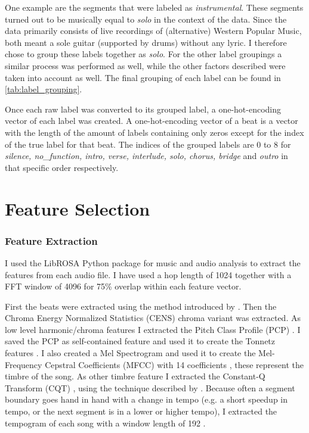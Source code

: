 One example are the segments that were labeled as \textit{instrumental}. These segments turned out to be musically equal to \textit{solo} in the context of the data. Since the data primarily consists of live recordings of (alternative) Western Popular Music, both meant a sole guitar (supported by drums) without any lyric. I therefore chose to group these labels together as \textit{solo}. For the other label groupings a similar process was performed as well, while the other factors described were taken into account as well. The final grouping of each label can be found in \autoref{tab:label_grouping}.

Once each raw label was converted to its grouped label, a one-hot-encoding vector of each label was created. A one-hot-encoding vector of a beat is a vector with the length of the amount of labels containing only zeros except for the index of the true label for that beat. The indices of the grouped labels are 0 to 8 for \textit{silence, no\_function, intro, verse, interlude, solo, chorus, bridge} and \textit{outro} in that specific order respectively.


\section{Feature Selection}
\subsubsection{Feature Extraction}

I used the LibROSA Python package for music and audio analysis \cite{Mcfee2015librosa} to extract the features from each audio file. I have used a hop length of 1024 together with a FFT window of 4096 for 75\% overlap within each feature vector.

First the beats were extracted using the method introduced by \textcite{Ellis2007beat}.
Then the Chroma Energy Normalized Statistics (CENS) \cite{Muller2005chroma} chroma variant was extracted. As low level harmonic/chroma features I extracted the Pitch Class Profile (PCP) \cite{Lee2006automatic}. I saved the PCP as self-contained feature and used it to create the Tonnetz features \cite{Harte2006detecting}. I also created a Mel Spectrogram \cite{Stevens1937scale} and used it to create the Mel-Frequency Cepstral Coefficients (MFCC) with 14 coefficients \cite{Logan2000mel}, these represent the timbre of the song. As other timbre feature I extracted the Constant-Q Transform (CQT) \cite{Brown1991calculation}, using the technique described by \textcite{Schorkhuber2010constant}. Because often a segment boundary goes hand in hand with a change in tempo (e.g. a short speedup in tempo, or the next segment is in a lower or higher tempo), I extracted the tempogram of each song with a window length of 192 \cite{Grosche2010cyclic}. 

